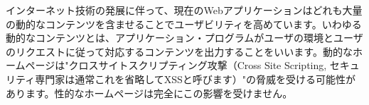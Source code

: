 インターネット技術の発展に伴って、現在のWebアプリケーションはどれも大量の動的なコンテンツを含ませることでユーザビリティを高めています。いわゆる動的なコンテンツとは、アプリケーション・プログラムがユーザの環境とユーザのリクエストに従って対応するコンテンツを出力することをいいます。動的なホームページは"クロスサイトスクリプティング攻撃（Cross Site Scripting, セキュリティ専門家は通常これを省略してXSSと呼びます）"の脅威を受ける可能性があります。性的なホームページは完全にこの影響を受けません。
